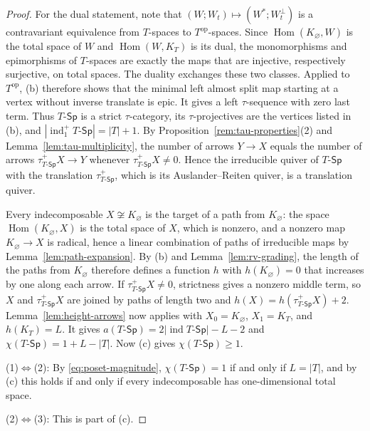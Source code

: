 \documentclass[a4paper,reqno,10pt]{amsart}
\theoremstyle{definition}
\numberwithin{equation}{section}
\DeclareMathOperator{\ind}{ind}
\DeclareMathOperator{\Hom}{Hom}
\newcommand{\op}{\mathrm{op}}
\newcommand{\TSp}{T\text{-}\mathsf{Sp}}
\begin{document}
\begin{proof}
For the dual statement, note that
\((W;W_t)\mapsto(W^*;W_t^\perp)\) is a contravariant equivalence from
\(T\)-spaces to \(T^{\op}\)-spaces. Since \(\Hom(K_\varnothing,W)\) is the
total space of \(W\) and \(\Hom(W,K_T)\) is its dual, the monomorphisms and
epimorphisms of \(T\)-spaces are exactly the maps that are injective,
respectively surjective, on total spaces. The duality exchanges these two
classes.
Applied to \(T^{\op}\), (b) therefore shows that the minimal left almost
split map starting at a vertex without inverse translate is epic. It
gives a left \(\tau\)-sequence with zero last term. Thus \(\TSp\) is a
strict \(\tau\)-category, its \(\tau\)-projectives are the vertices listed
in (b), and \(|\ind_1^+\TSp|=|T|+1\). By
Proposition~\ref{rem:tau-properties}(2) and Lemma~\ref{lem:tau-multiplicity},
the number of arrows \(Y\to X\) equals the number of arrows
\(\tau_{\TSp}^+X\to Y\) whenever \(\tau_{\TSp}^+X\ne0\). Hence the
irreducible quiver of \(\TSp\) with the translation \(\tau_{\TSp}^+\), which
is its Auslander--Reiten quiver, is a translation quiver.

Every indecomposable \(X\not\cong K_\varnothing\) is the target of a path
from \(K_\varnothing\): the space \(\Hom(K_\varnothing,X)\) is the total
space of \(X\), which is nonzero, and a nonzero map \(K_\varnothing\to X\)
is radical, hence a linear combination of paths of irreducible maps by
Lemma~\ref{lem:path-expansion}. By (b) and Lemma~\ref{lem:rv-grading}, the
length of the paths from \(K_\varnothing\) therefore defines a function
\(h\) with \(h(K_\varnothing)=0\) that increases by one along each arrow. If \(\tau_{\TSp}^+X\ne0\),
strictness gives a nonzero middle term, so \(X\) and \(\tau_{\TSp}^+X\) are
joined by paths of length two and \(h(X)=h(\tau_{\TSp}^+X)+2\).
Lemma~\ref{lem:height-arrows} now applies with \(X_0=K_\varnothing\),
\(X_1=K_T\), and \(h(K_T)=L\). It gives \(a(\TSp)=2|\ind\TSp|-L-2\) and
\(\chi(\TSp)=1+L-|T|\). Now (c) gives
\(\chi(\TSp)\geq1\).

(1)\(\Leftrightarrow\)(2): By \eqref{eq:poset-magnitude}, \(\chi(\TSp)=1\) if and only if
\(L=|T|\), and by (c) this holds if and only if every indecomposable has
one-dimensional total space.

(2)\(\Leftrightarrow\)(3): This is part of (c).
\end{proof}
\end{document}
